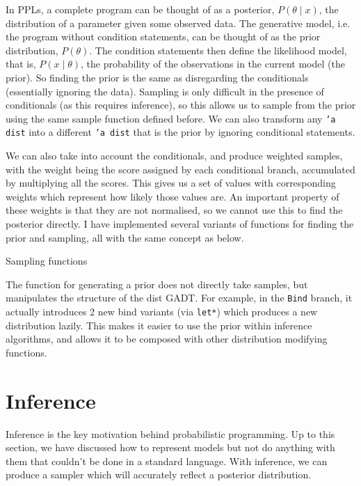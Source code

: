 In PPLs, a complete program can be thought of as a posterior, $P(\theta\mid x)$, the distribution of a parameter given some observed data. The generative model, i.e. the program without condition statements, can be thought of as the prior distribution, $P(\theta)$. The condition statements then define the likelihood model, that is, $P(x\mid \theta)$, the probability of the observations in the current model (the prior). So finding the prior is the same as disregarding the conditionals (essentially ignoring the data). Sampling is only difficult in the presence of conditionals (as this requires inference), so this allows us to sample from the prior using the same sample function defined before. We can also transform any \texttt{'a dist} into a different \texttt{'a dist} that is the prior by ignoring conditional statements.
		
We can also take into account the conditionals, and produce weighted samples, with the weight being the score assigned by each conditional branch, accumulated by multiplying all the scores. This gives us a set of values with corresponding weights which represent how likely those values are. An important property of these weights is that they are not normalised, so we cannot use this to find the posterior directly. I have implemented several variants of functions for finding the prior and sampling, all with the same concept as below.
	
\begin{listing}[!htb]
	\centering
	\caption{Sampling functions}
\end{listing}
	
The function for generating a prior does not directly take samples, but manipulates the structure of the dist GADT. For example, in the \texttt{Bind} branch, it actually introduces 2 new bind variants (via \texttt{let*}) which produces a new distribution lazily. This makes it easier to use the prior within inference algorithms, and allows it to be composed with other distribution modifying functions.
	
\section{Inference} \label{sec:inference}
	
Inference is the key motivation behind probabilistic programming. Up to this section, we have discussed how to represent models but not do anything with them that couldn't be done in a standard language. With inference, we can produce a sampler which will accurately reflect a posterior distribution.
	
